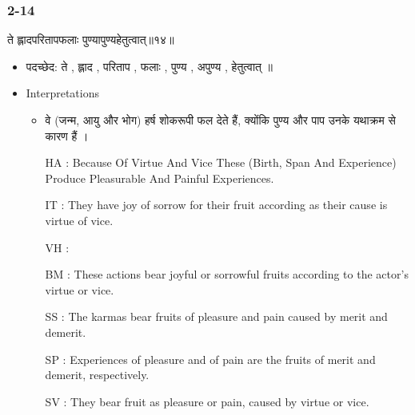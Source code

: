 \begin{frame}[fragile]\frametitle{2-14}
\begin{sanskrit}
ते ह्लादपरितापफलाः पुण्यापुण्यहेतुत्वात्॥१४॥
\end{sanskrit}

	\begin{itemize}
	\item पदच्छेद: ते , ह्लाद , परिताप , फलाः , पुण्य , अपुण्य , हेतुत्वात् ॥
	\item Interpretations
		\begin{itemize}
		\item वे (जन्म, आयु और भोग) हर्ष शोकरूपी फल देते हैं, क्योंकि पुण्य और पाप उनके यथाक्रम से कारण हैं ।
		\item [HA]: Because Of Virtue And Vice These (Birth, Span And Experience) Produce Pleasurable And Painful Experiences.
		\item [IT]: They have joy of sorrow for their fruit according as their cause is virtue of vice.
		\item [VH]: 
		\item [BM]: These actions bear joyful or sorrowful fruits according to the actor’s virtue or vice.
		\item [SS]: The karmas bear fruits of pleasure and pain caused by merit and demerit.
		\item [SP]: Experiences of pleasure and of pain are the fruits of merit and demerit, respectively.
		\item [SV]: They bear fruit as pleasure or pain, caused by virtue or vice. 
		\end{itemize}
	\end{itemize}
	
\end{frame}


